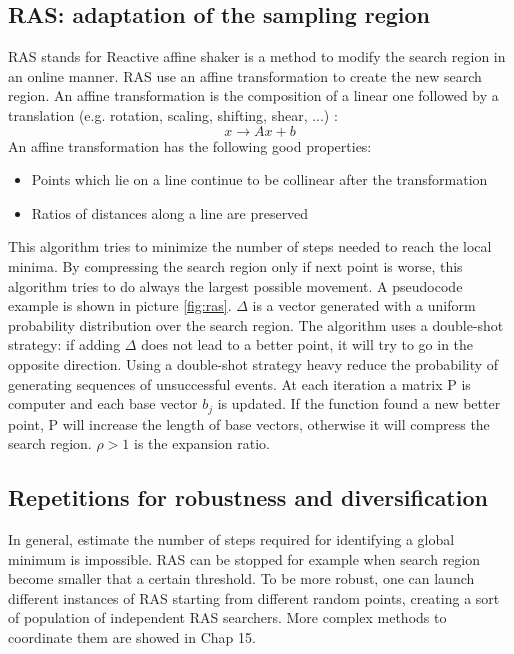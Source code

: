 \documentclass[11pt]{article}
\begin{document}
\subsection{RAS: adaptation of the sampling region}
RAS stands for Reactive affine shaker is a method to modify the search region in an online manner. RAS use an affine transformation to 
create the new search region. An affine transformation is the composition of a linear one followed by a translation (e.g. rotation, scaling, shifting, shear, ...) :
$$
x \rightarrow Ax + b
$$
An affine transformation has the following good properties:
\begin{itemize}
\item{Points which lie on a line continue to be collinear after the transformation}
\item{Ratios of distances along a line are preserved}
\end{itemize}

This algorithm tries to minimize the number of steps needed to reach the local minima. By compressing the search region only if next point is worse, this algorithm tries to do always the largest possible movement. A pseudocode example is shown in picture \ref{fig:ras}. $\Delta$ is a vector generated with a uniform probability distribution over the search region. The algorithm uses a double-shot strategy: if adding $\Delta$ does not lead to a better point, it will try to go in the opposite direction. Using a double-shot strategy heavy reduce the probability of generating sequences of unsuccessful events. At each iteration a matrix P is computer and each base vector $b_j$ is updated.
If the function found a new better point, P will increase the length of base vectors, otherwise it will compress the search region. $\rho > 1$ is the expansion ratio. 

\subsection{Repetitions for robustness and diversification}

In general, estimate the number of steps required for identifying a global minimum is impossible. RAS can be stopped for example when search region become smaller that a certain threshold. To be more robust, one can launch different instances of RAS starting from different random points, creating a sort of population of independent RAS searchers. More complex methods to coordinate them are showed in Chap 15.
\end{document}
